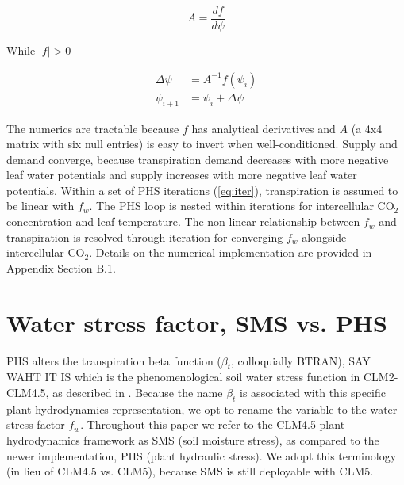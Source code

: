 \documentclass[draft,linenumbers]{agujournal}
\begin{document}
    \begin{linenomath*}
    \begin{equation}
    A = \dfrac{df}{d\psi}
    \end{equation}
    \end{linenomath*}    
    
    While $\left|f\right|>0$
    \begin{linenomath*}
    \begin{equation} \begin{aligned}
    \label{eq:iter}
    \Delta\psi &=A^{-1}f\left(\psi_i\right) \\
    \psi_{i+1}  &= \psi_i + \Delta\psi
    \end{aligned} \end{equation}
    \end{linenomath*}    
    
    The numerics are tractable because $f$ has analytical derivatives and $A$ 
    (a 4x4 matrix with six null entries) is easy to invert when well-conditioned. 
    Supply and demand converge, because transpiration demand decreases with more negative 
    leaf water potentials and supply increases with more negative leaf water potentials.
    Within a set of PHS iterations (\ref{eq:iter}), transpiration is assumed to be linear with $f_w$.
    The PHS loop is nested within iterations for intercellular CO$_2$ concentration and leaf temperature.
    The non-linear relationship between $f_w$ and transpiration is resolved through iteration for converging $f_w$ alongside intercellular CO$_2$.
    Details on the numerical implementation are provided in Appendix Section B.1.


\section{Water stress factor, SMS vs. PHS}
\label{sect:btran}
    PHS alters the transpiration beta function ($\beta_t$, colloquially BTRAN), SAY WAHT IT IS 
    which is the phenomenological soil water stress function in CLM2-CLM4.5, as described in \citet{oleson2013}.
    Because the name $\beta_t$ is associated with this specific plant hydrodynamics representation, we opt to rename the variable to the water stress factor $f_w$.
    Throughout this paper we refer to the CLM4.5 plant hydrodynamics framework as SMS (soil moisture stress), 
    as compared to the newer implementation, PHS (plant hydraulic stress).
    We adopt this terminology (in lieu of CLM4.5 vs. CLM5), because SMS is still deployable with CLM5. 
    
\end{document}
